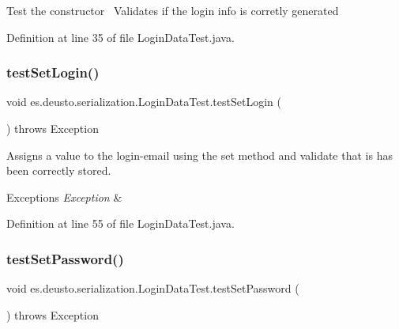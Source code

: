 Test the constructor~\newline
 Validates if the login info is corretly generated~\newline
 

Definition at line 35 of file Login\+Data\+Test.\+java.

\mbox{\label{classes_1_1deusto_1_1serialization_1_1_login_data_test_ae7fdbf8f891137e9442c2560d38d109d}} 
\subsubsection{\texorpdfstring{test\+Set\+Login()}{testSetLogin()}}
{\footnotesize\ttfamily void es.\+deusto.\+serialization.\+Login\+Data\+Test.\+test\+Set\+Login (\begin{DoxyParamCaption}{ }\end{DoxyParamCaption}) throws Exception}

Assigns a value to the login-\/email using the set method and validate that is has been correctly stored.~\newline

\begin{DoxyExceptions}{Exceptions}
{\em Exception} & \\
\hline
\end{DoxyExceptions}


Definition at line 55 of file Login\+Data\+Test.\+java.

\mbox{\label{classes_1_1deusto_1_1serialization_1_1_login_data_test_aac8283467e1233be9119041e34aaf969}} 
\subsubsection{\texorpdfstring{test\+Set\+Password()}{testSetPassword()}}
{\footnotesize\ttfamily void es.\+deusto.\+serialization.\+Login\+Data\+Test.\+test\+Set\+Password (\begin{DoxyParamCaption}{ }\end{DoxyParamCaption}) throws Exception}

